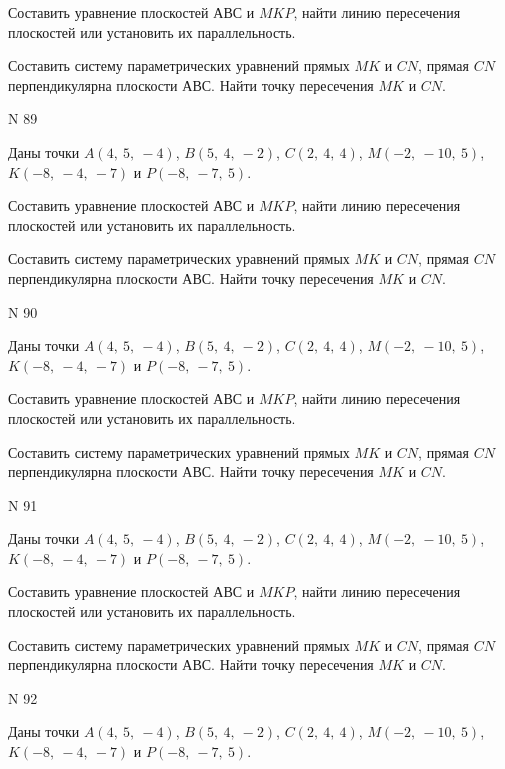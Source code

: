 \documentclass[11pt]{report}
\begin{document}
Составить уравнение плоскостей $АВС$ и $MKP$,
найти линию пересечения плоскостей или установить их параллельность.

Составить систему параметрических уравнений прямых $MK$ и $CN$,
прямая $CN$ перпендикулярна плоскости $АВС$. 
Найти точку пересечения $MK$ и $CN$.



 N 89

Даны точки $A\left( 4, \  5, \  -4\right)$, $B\left( 5, \  4, \  -2\right)$, $C\left( 2, \  4, \  4\right)$, $M\left( -2, \  -10, \  5\right)$, $K\left( -8, \  -4, \  -7\right)$ и $P\left( -8, \  -7, \  5\right)$.


Составить уравнение плоскостей $АВС$ и $MKP$,
найти линию пересечения плоскостей или установить их параллельность.

Составить систему параметрических уравнений прямых $MK$ и $CN$,
прямая $CN$ перпендикулярна плоскости $АВС$. 
Найти точку пересечения $MK$ и $CN$.



 N 90

Даны точки $A\left( 4, \  5, \  -4\right)$, $B\left( 5, \  4, \  -2\right)$, $C\left( 2, \  4, \  4\right)$, $M\left( -2, \  -10, \  5\right)$, $K\left( -8, \  -4, \  -7\right)$ и $P\left( -8, \  -7, \  5\right)$.


Составить уравнение плоскостей $АВС$ и $MKP$,
найти линию пересечения плоскостей или установить их параллельность.

Составить систему параметрических уравнений прямых $MK$ и $CN$,
прямая $CN$ перпендикулярна плоскости $АВС$. 
Найти точку пересечения $MK$ и $CN$.



 N 91

Даны точки $A\left( 4, \  5, \  -4\right)$, $B\left( 5, \  4, \  -2\right)$, $C\left( 2, \  4, \  4\right)$, $M\left( -2, \  -10, \  5\right)$, $K\left( -8, \  -4, \  -7\right)$ и $P\left( -8, \  -7, \  5\right)$.


Составить уравнение плоскостей $АВС$ и $MKP$,
найти линию пересечения плоскостей или установить их параллельность.

Составить систему параметрических уравнений прямых $MK$ и $CN$,
прямая $CN$ перпендикулярна плоскости $АВС$. 
Найти точку пересечения $MK$ и $CN$.



 N 92

Даны точки $A\left( 4, \  5, \  -4\right)$, $B\left( 5, \  4, \  -2\right)$, $C\left( 2, \  4, \  4\right)$, $M\left( -2, \  -10, \  5\right)$, $K\left( -8, \  -4, \  -7\right)$ и $P\left( -8, \  -7, \  5\right)$.
\end{document}
